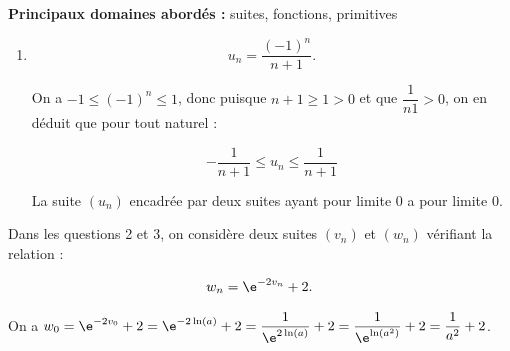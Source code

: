 
\textbf{Principaux domaines abordés :} suites, fonctions, primitives

\medskip

%

\begin{enumerate}
\item %

\[u_n = \dfrac{(- 1)^n}{n + 1}.\]

On a $- 1 \leqslant (- 1)^n \leqslant 1$, donc puisque $n+1 \geqslant 1 > 0$ et que $\dfrac{1}{n  1} > 0$, on en déduit que pour tout naturel :

\[- \dfrac{1}{n+1} \leqslant u_n \leqslant \dfrac{1}{n+1}\]

La suite $\left(u_n\right)$ encadrée par deux suites ayant pour limite 0 a pour limite 0.
\begin{center} \decosix \decosix \decosix  \end{center}
\end{enumerate}

Dans les questions 2 et 3, on considère deux suites $\left(v_n\right)$  et $\left(w_n\right)$ vérifiant la relation : 

\[w_n = \e^{- 2v_n} + 2.\]

%
On a $w_0 = \e^{- 2v_0} + 2 = \e^{- 2\ln (a)} + 2 = \dfrac{1}{\e^{2\ln(a)}} + 2=  \dfrac{1}{\e^{\ln \left(a^2\right)}} + 2 = \dfrac{1}{a^2} + 2$.

